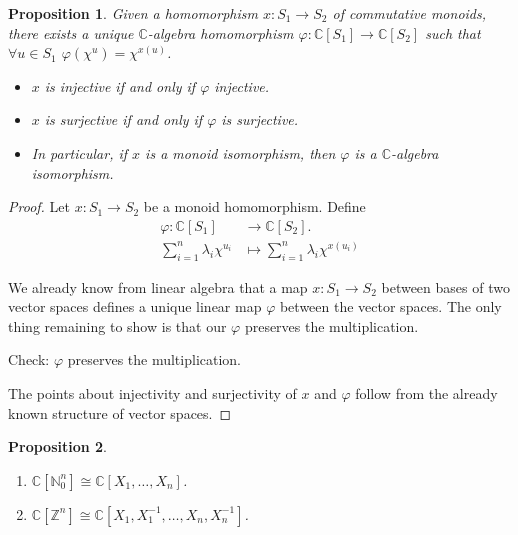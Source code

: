 \documentclass[12pt]{article}
\newtheorem*{proposition}{Proposition}
\theoremstyle{definition}
\begin{document}
\begin{proposition}
Given a homomorphism $x:S_1\rightarrow S_2$ of commutative monoids, there exists a unique $\mathbb{C}$-algebra homomorphism $\varphi:\mathbb{C}[S_1]\rightarrow\mathbb{C}[S_2]$ such that $\forall u\in S_1$ $\varphi(\chi^u)=\chi^{x(u)}$.
\begin{itemize}
\item $x$ is injective if and only if $\varphi$ injective.

\item $x$ is surjective if and only if $\varphi$ is surjective.

\item In particular, if $x$ is a monoid isomorphism, then $\varphi$ is a $\mathbb{C}$-algebra isomorphism.
\end{itemize}
\end{proposition}

\begin{proof}
Let $x:S_1\rightarrow S_2$ be a monoid homomorphism. Define
\begin{align*}
\varphi:\mathbb{C}[S_1]&\longrightarrow\mathbb{C}[S_2].\\
\sum_{i=1}^n\lambda_i\chi^{u_i}&\longmapsto\sum_{i=1}^n\lambda_i\chi^{x(u_i)}
\end{align*}

We already know from linear algebra that a map $x:S_1\rightarrow S_2$ between bases of two vector spaces defines a unique linear map $\varphi$ between the vector spaces. The only thing remaining to show is that our $\varphi$ preserves the multiplication.

Check: $\varphi$ preserves the multiplication.

The points about injectivity and surjectivity of $x$ and $\varphi$ follow from the already known structure of vector spaces.
\end{proof}

\begin{proposition}
\begin{enumerate}[label=\arabic*)]
\item $\mathbb{C}[\mathbb{N}_0^n]\cong\mathbb{C}[X_1,\ldots,X_n]$.

\item $\mathbb{C}[\mathbb{Z}^n]\cong\mathbb{C}[X_1,X_1^{-1},\ldots,X_n,X_n^{-1}]$.
\end{enumerate}
\end{proposition}
\end{document}

